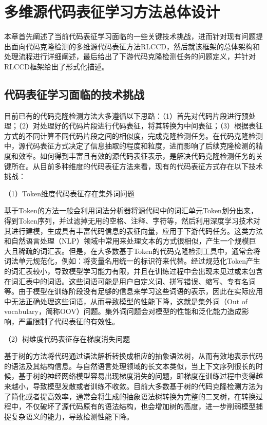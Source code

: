 \chapter{多维源代码表征学习方法总体设计}
\label{chap:design}

本章首先阐述了当前代码表征学习面临的一些关键技术挑战，进而针对现有问题提出面向代码克隆检测的多维源代码表征方法RLCCD，然后就该框架的总体架构和处理流程进行详细阐述，最后给出了下游代码克隆检测任务的问题定义，并针对RLCCD框架给出了形式化描述。

\section{代码表征学习面临的技术挑战}
\label{sec:challenges}
目前已有的代码克隆检测方法大多遵循以下思路：（1）首先对代码片段进行预处理；（2）对处理好的代码片段进行代码表征，将其转换为中间表征；（3）根据表征方式的不同计算不同代码片段之间的相似度，完成克隆检测任务。在代码克隆检测中，源代码表征方式决定了信息抽取的程度和粒度，进而影响了后续克隆检测的精度和效率。如何得到丰富且有效的源代码表征表示，是解决代码克隆检测任务的关键所在。从目前多种维度的代码表征方法来看，现有的代码表征方式存在以下技术挑战：

（1）Token维度代码表征存在集外词问题

基于Token的方法一般会利用词法分析器将源代码中的词汇单元Token划分出来，得到Token序列，并过滤掉无用的空格、注释、字符等，然后利用深度学习技术对其进行建模，生成具有丰富代码信息的表征向量，应用于下游代码任务。这类方法和自然语言处理（NLP）领域中常用来处理文本的方式很相似，产生一个规模巨大且稀疏的词汇表。但是，在大多数基于Token的代码克隆检测工具中，通常会将词法单元规范化，例如：将变量名用统一的标识符来代替。经过规范化Token产生的词汇表较小，导致模型学习能力有限，并且在训练过程中会出现未见过或未包含在词汇表中的词语。这些词语可能是用户自定义词、拼写错误、缩写、专有名词等。由于模型在训练阶段没有足够的信息来学习这些词语的表示，因此在实际应用中无法正确处理这些词语，从而导致模型的性能下降，这就是集外词（Out of vocabulary，简称OOV）问题。集外词问题会对模型的性能和泛化能力造成影响，严重限制了代码表征的有效性。

（2）树维度代码表征存在梯度消失问题

基于树的方法将代码通过语法解析转换成相应的抽象语法树，从而有效地表示代码的语法及其结构信息。与自然语言处理领域的长文本类似，当上下文序列很长的时候，基于树的神经网络模型容易出现梯度消失的问题，即梯度在训练过程中变得越来越小，导致模型发散或者训练不收敛。目前大多数基于树的代码克隆检测方法为了简化或者提高效率，通常会将生成的抽象语法树转换为完整的二叉树，在转换过程中，不仅破坏了源代码原有的语法结构，也会增加树的高度，进一步削弱模型捕捉复杂语义的能力，导致检测性能下降。

